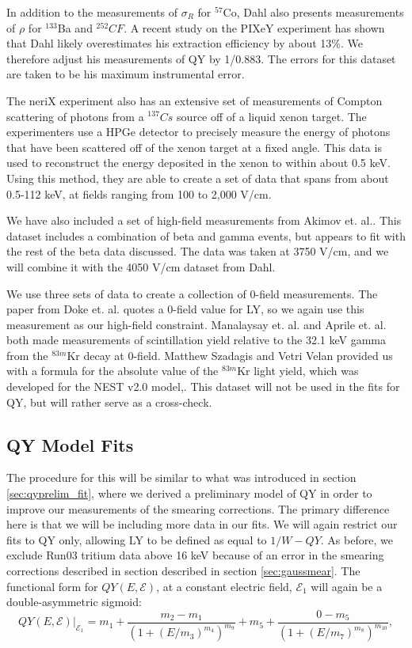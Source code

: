 In addition to the measurements of $\sigma_R$ for $^{57}$Co, Dahl also presents measurements of $\rho$ for $^{133}$Ba and $^{252}CF$\cite{dahl}. A recent study on the PIXeY experiment has shown that Dahl likely overestimates his extraction efficiency by about 13\%\cite{pixey_extraction}. We therefore adjust his measurements of QY by 1/0.883. The errors for this dataset are taken to be his maximum instrumental error.

The neriX experiment also has an extensive set of measurements of Compton scattering of photons from a $^{137}Cs$ source off of a liquid xenon target\cite{nerix}. The experimenters use a HPGe detector to precisely measure the energy of photons that have been scattered off of the xenon target at a fixed angle. This data is used to reconstruct the energy deposited in the xenon to within about 0.5 keV. Using this method, they are able to create a set of data that spans from about 0.5-112 keV, at fields ranging from 100 to 2,000 V/cm.

We have also included a set of high-field measurements from Akimov et. al.\cite{akimov}. This dataset includes a combination of beta and gamma events, but appears to fit with the rest of the beta data discussed. The data was taken at 3750 V/cm, and we will combine it with the 4050 V/cm dataset from Dahl.

We use three sets of data to create a collection of 0-field measurements. The paper from Doke et. al. quotes a 0-field value for LY, so we again use this measurement as our high-field constraint. Manalaysay et. al. and Aprile et. al. both made measurements of scintillation yield relative to the 32.1 keV gamma from the $^{83m}$Kr decay at 0-field\cite{zerofield1,zerofield2}. Matthew Szadagis and Vetri Velan provided us with a formula for the absolute value of the $^{83m}$Kr light yield, which was developed for the NEST v2.0 model,\cite{matthew}. This dataset will not be used in the fits for QY, but will rather serve as a cross-check.

\subsection{QY Model Fits}
The procedure for this will be similar to what was introduced in section \ref{sec:qyprelim_fit}, where we derived a preliminary model of QY in order to improve our measurements of the smearing corrections. The primary difference here is that we will be including more data in our fits. We will again restrict our fits to QY only, allowing LY to be defined as equal to $1/W-QY$. As before, we exclude Run03 tritium data above 16 keV because of an error in the smearing corrections described in section described in section \ref{sec:gaussmear}. The functional form for $QY(E,\mathcal{E})$, at a constant electric field, $\mathcal{E}_1$ will again be a double-asymmetric sigmoid:
\begin{equation}
QY(E,\mathcal{E})|_{\mathcal{E}_1}=m_1+\frac{m_2-m_1}{(1+(E/m_3)^{m_4})^{m_9}}+m_5+\frac{0-m_5}{(1+(E/m_7)^{m_8})^{m_{10}}},
\end{equation}

